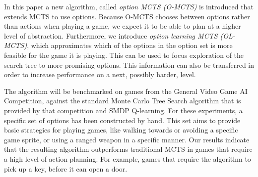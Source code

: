 In this paper a new algorithm, called \emph{option MCTS (O-MCTS)} is introduced
that extends MCTS to use options. Because O-MCTS chooses between options rather
than actions when playing a game, we expect it to be able to plan at a higher
level of abstraction. Furthermore, we introduce \emph{option learning MCTS
(OL-MCTS)}, which approximates which of the options in the option set is more
feasible for the game it is playing. This can be used to focus exploration of
the search tree to more promising options. This information can also be
transferred in order to increase performance on a next, possibly harder, level. 

The algorithm will be benchmarked on games from the General Video Game AI
Competition, against the standard Monte Carlo Tree Search
algorithm that is provided by that competition and SMDP Q-learning. For these experiments, a
specific set of options has been constructed by hand. This set aims to provide
basic strategies for playing games, like walking towards or avoiding a specific
game sprite, or using a ranged weapon in a specific manner. Our results indicate
that the resulting algorithm outperforms traditional MCTS in games that require
a high level of action planning. For example, games that require the algorithm
to pick up a key, before it can open a door. 
